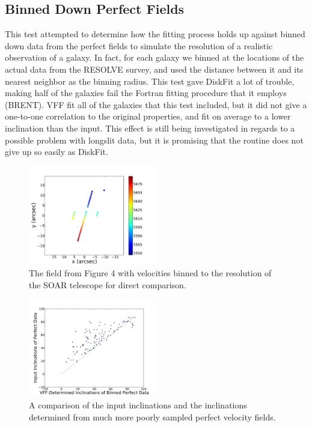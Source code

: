 \documentclass{emulateapj}
\begin{document}
\subsection{Binned Down Perfect Fields}
This test attempted to determine how the fitting process holds up against binned down data from the perfect fields to simulate the resolution of a realistic observation of a galaxy. In fact, for each galaxy we binned at the locations of the actual data from the RESOLVE survey, and used the distance between it and its nearest neighbor as the binning radius. This test gave DiskFit a lot of trouble, making half of the galaxies fail the Fortran fitting procedure that it employs (BRENT). VFF fit all of the galaxies that this test included, but it did not give a one-to-one correlation to the original properties, and fit on average to a lower inclination than the input. This effect is still being investigated in regards to a possible problem with longslit data, but it is promising that the routine does not give up so easily as DiskFit.
\begin{figure}[h]
\includegraphics[width=0.5\textwidth]{binnedvels.pdf}
\caption{The field from Figure 4 with velocities binned to the resolution of the SOAR telescope for direct comparison. \label{fig:test}}
\end{figure}

\begin{figure}[h]
\includegraphics[width=0.5\textwidth]{binnedtest.pdf}
\caption{A comparison of the input inclinations and the inclinations determined from much more poorly sampled perfect velocity fields. \label{fig:test}}
\end{figure}
\end{document}
